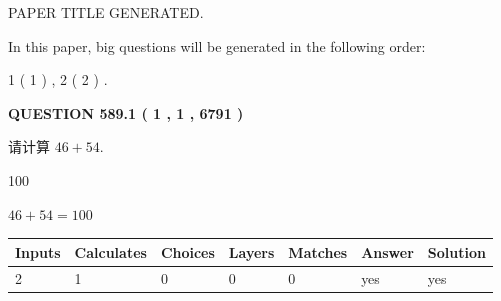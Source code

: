 \documentclass{ctexart}
\begin{document}
   
\vspace{0.2in}
   
   
   
   
   
   
   
   
 \vspace{0.2in}
 
 
 
 
   
   
 PAPER TITLE GENERATED.
   
   
   
\vspace{0.2in}
   
In this paper, big questions will be generated in the following order: 
   
   
   1 ( 1 )
 ,
   2 ( 2 )
 .
  
\vspace{0.2in}
  
{\textbf{\Large{QUESTION
589.1 
 ( 1 , 1 , 6791 )
}}}
  
  
 
请计算 $ %
46 +  %
54 $.
 
 
 
\noindent{}
 
 

100
 
 
\noindent{}
 
 

 
 
 
\noindent{}
 
 

$ %
46 +  %
54=   %
100$
 
 
\noindent{}
 
 

 
   
   
   
   
\noindent\begin{tabular}{|l|l|l|l|l|l|l|}
 \hline
Inputs & Calculates & Choices & Layers & Matches & Answer & Solution \\ \hline
 2  & 
 1  & 
 0
  & 
 0  & 
 0  & 
  yes & 
  yes 
  \\ \hline
 \end{tabular}
   
\end{document}
